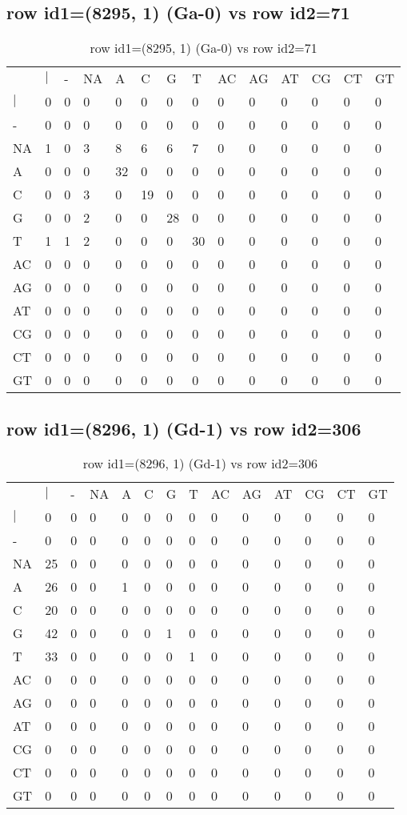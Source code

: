 \subsection{row id1=(8295, 1) (Ga-0) vs row id2=71}
\begin{center}
\begin{longtable}{|l|l|l|l|l|l|l|l|l|l|l|l|l|l|}
\caption{row id1=(8295, 1) (Ga-0) vs row id2=71} \label{table_dm274}\\
\hline
\\
\hline
&$|$&-&NA&A&C&G&T&AC&AG&AT&CG&CT&GT\\
$|$&0&0&0&0&0&0&0&0&0&0&0&0&0\\
-&0&0&0&0&0&0&0&0&0&0&0&0&0\\
NA&1&0&3&8&6&6&7&0&0&0&0&0&0\\
A&0&0&0&32&0&0&0&0&0&0&0&0&0\\
C&0&0&3&0&19&0&0&0&0&0&0&0&0\\
G&0&0&2&0&0&28&0&0&0&0&0&0&0\\
T&1&1&2&0&0&0&30&0&0&0&0&0&0\\
AC&0&0&0&0&0&0&0&0&0&0&0&0&0\\
AG&0&0&0&0&0&0&0&0&0&0&0&0&0\\
AT&0&0&0&0&0&0&0&0&0&0&0&0&0\\
CG&0&0&0&0&0&0&0&0&0&0&0&0&0\\
CT&0&0&0&0&0&0&0&0&0&0&0&0&0\\
GT&0&0&0&0&0&0&0&0&0&0&0&0&0\\
\hline
\end{longtable}
\end{center}

\subsection{row id1=(8296, 1) (Gd-1) vs row id2=306}
\begin{center}
\begin{longtable}{|l|l|l|l|l|l|l|l|l|l|l|l|l|l|}
\caption{row id1=(8296, 1) (Gd-1) vs row id2=306} \label{table_dm276}\\
\hline
\\
\hline
&$|$&-&NA&A&C&G&T&AC&AG&AT&CG&CT&GT\\
$|$&0&0&0&0&0&0&0&0&0&0&0&0&0\\
-&0&0&0&0&0&0&0&0&0&0&0&0&0\\
NA&25&0&0&0&0&0&0&0&0&0&0&0&0\\
A&26&0&0&1&0&0&0&0&0&0&0&0&0\\
C&20&0&0&0&0&0&0&0&0&0&0&0&0\\
G&42&0&0&0&0&1&0&0&0&0&0&0&0\\
T&33&0&0&0&0&0&1&0&0&0&0&0&0\\
AC&0&0&0&0&0&0&0&0&0&0&0&0&0\\
AG&0&0&0&0&0&0&0&0&0&0&0&0&0\\
AT&0&0&0&0&0&0&0&0&0&0&0&0&0\\
CG&0&0&0&0&0&0&0&0&0&0&0&0&0\\
CT&0&0&0&0&0&0&0&0&0&0&0&0&0\\
GT&0&0&0&0&0&0&0&0&0&0&0&0&0\\
\hline
\end{longtable}
\end{center}

